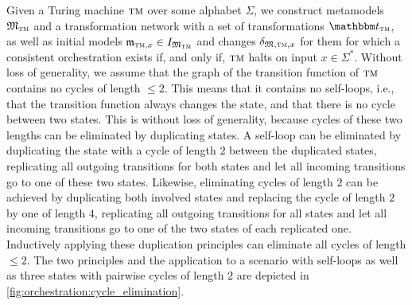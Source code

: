 Given a Turing machine $\textsc{tm}$ over some alphabet $\Sigma$, we construct metamodels $\metamodeltuple{M}_{\TuringMachine}$ and a transformation network with a set of transformations $\transformationset{T}_{\TuringMachine}$, as well as initial models $\modeltuple{m}_{\TuringMachine, x} \in \metamodeltupleinstanceset{M_{\TuringMachine}}$ and changes $\changetuple{\metamodeltuple{M},\TuringMachine,x}$ for them for which a consistent orchestration exists if, and only if, $\textsc{tm}$ halts on input $x \in \Sigma^*$.
Without loss of generality, we assume that the graph of the transition function of $\textsc{tm}$ contains no cycles of length $\leq 2$.
This means that it contains no self-loops, i.e., that the transition function always changes the state, and that there is no cycle between two states.
This is without loss of generality, because cycles of these two lengths can be eliminated by duplicating states.
A self-loop can be eliminated by duplicating the state with a cycle of length $2$ between the duplicated states,  replicating all outgoing transitions for both states and let all incoming transitions go to one of these two states.
Likewise, eliminating cycles of length $2$ can be achieved by duplicating both involved states and replacing the cycle of length $2$ by one of length $4$, replicating all outgoing transitions for all states and let all incoming transitions go to one of the two states of each replicated one.
Inductively applying these duplication principles can eliminate all cycles of length $\leq 2$.
The two principles and the application to a scenario with self-loops as well as three states with pairwise cycles of length $2$ are depicted in \autoref{fig:orchestration:cycle_elimination}.

